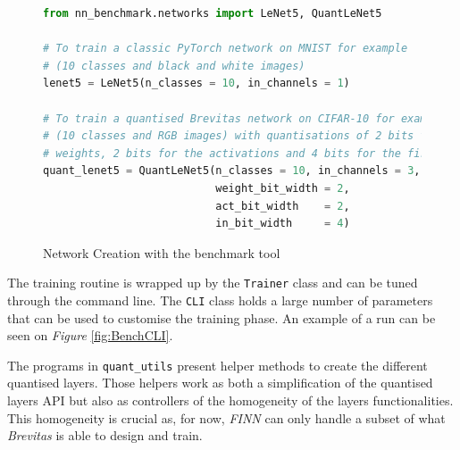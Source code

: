 

\begin{figure}[htbp]
\centering
\begin{lstlisting}[language=Python]
from nn_benchmark.networks import LeNet5, QuantLeNet5

# To train a classic PyTorch network on MNIST for example
# (10 classes and black and white images)
lenet5 = LeNet5(n_classes = 10, in_channels = 1)

# To train a quantised Brevitas network on CIFAR-10 for example
# (10 classes and RGB images) with quantisations of 2 bits for the
# weights, 2 bits for the activations and 4 bits for the first layer
quant_lenet5 = QuantLeNet5(n_classes = 10, in_channels = 3,
                           weight_bit_width = 2,
                           act_bit_width    = 2,
                           in_bit_width     = 4)
\end{lstlisting}
\caption[NetworkCreation]{Network Creation with the benchmark tool}
	\label{fig:NetworkCreation}
\end{figure}


The training routine is wrapped up by the \texttt{Trainer} class and can be tuned through the command line. The \texttt{CLI} class holds a large number of parameters that can be used to customise the training phase. An example of a run can be seen on \emph{Figure} \ref{fig:BenchCLI}.


The programs in \texttt{quant\_utils\/} present helper methods to create the different quantised layers. Those helpers work as both a simplification of the quantised layers API but also as controllers of the homogeneity of the layers functionalities. This homogeneity is crucial as, for now, \emph{FINN} can only handle a subset of what \emph{Brevitas} is able to design and train.


